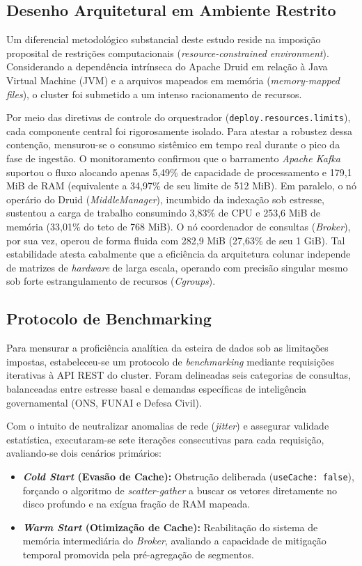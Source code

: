 \documentclass[12pt, a4paper]{article}
\begin{document}
\subsection{Desenho Arquitetural em Ambiente Restrito}
Um diferencial metodológico substancial deste estudo reside na imposição proposital de restrições computacionais (\textit{resource-constrained environment}). Considerando a dependência intrínseca do Apache Druid em relação à Java Virtual Machine (JVM) e a arquivos mapeados em memória (\textit{memory-mapped files}), o cluster foi submetido a um intenso racionamento de recursos.

Por meio das diretivas de controle do orquestrador (\texttt{deploy.resources.limits}), cada componente central foi rigorosamente isolado. Para atestar a robustez dessa contenção, mensurou-se o consumo sistêmico em tempo real durante o pico da fase de ingestão. O monitoramento confirmou que o barramento \textit{Apache Kafka} suportou o fluxo alocando apenas 5,49\% de capacidade de processamento e 179,1 MiB de RAM (equivalente a 34,97\% de seu limite de 512 MiB). Em paralelo, o nó operário do Druid (\textit{MiddleManager}), incumbido da indexação sob estresse, sustentou a carga de trabalho consumindo 3,83\% de CPU e 253,6 MiB de memória (33,01\% do teto de 768 MiB). O nó coordenador de consultas (\textit{Broker}), por sua vez, operou de forma fluida com 282,9 MiB (27,63\% de seu 1 GiB). Tal estabilidade atesta cabalmente que a eficiência da arquitetura colunar independe de matrizes de \textit{hardware} de larga escala, operando com precisão singular mesmo sob forte estrangulamento de recursos (\textit{Cgroups}).

\subsection{Protocolo de Benchmarking}
Para mensurar a proficiência analítica da esteira de dados sob as limitações impostas, estabeleceu-se um protocolo de \textit{benchmarking} mediante requisições iterativas à API REST do cluster. Foram delineadas seis categorias de consultas, balanceadas entre estresse basal e demandas específicas de inteligência governamental (ONS, FUNAI e Defesa Civil).

Com o intuito de neutralizar anomalias de rede (\textit{jitter}) e assegurar validade estatística, executaram-se sete iterações consecutivas para cada requisição, avaliando-se dois cenários primários:
\begin{itemize}
    \item \textbf{\textit{Cold Start} (Evasão de Cache):} Obstrução deliberada (\texttt{useCache: false}), forçando o algoritmo de \textit{scatter-gather} a buscar os vetores diretamente no disco profundo e na exígua fração de RAM mapeada.
    \item \textbf{\textit{Warm Start} (Otimização de Cache):} Reabilitação do sistema de memória intermediária do \textit{Broker}, avaliando a capacidade de mitigação temporal promovida pela pré-agregação de segmentos.
\end{itemize}
\end{document}
